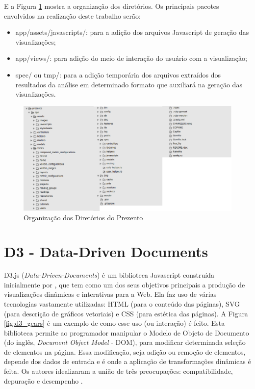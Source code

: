 \newpage

E a Figura \ref{fig:prezento_folders} mostra a organização dos diretórios. Os
principais pacotes envolvidos na realização deste trabalho serão:

\begin{itemize}
  \item app/assets/javascripts/: para a adição dos arquivos Javascript de
  geração das visualizações;
  \item app/views/: para adição do meio de interação do usuário com a
  visualização;
  \item spec/ ou tmp/: para a adição temporária dos arquivos extraídos dos
  resultados da análise em determinado formato que auxiliará na geração das
  visualizações.
\end{itemize}

\begin{figure}[!htb]
	\centering
    \includegraphics[keepaspectratio=true,scale=0.5]
    {figuras/prezento_folders.eps}
  \caption{Organização dos Diretórios do Prezento}
  \label{fig:prezento_folders}
\end{figure}

\newpage

\section{D3 - Data-Driven Documents}

D3.js (\textit{Data-Driven-Documents}) é um biblioteca Javascript construída
inicialmente por , que tem como um dos seus objetivos
principais a produção de visualizações dinâmicas e interativas para a Web. Ela
faz uso de várias tecnologias vastamente utilizadas: HTML (para o conteúdo das
páginas), SVG (para descrição de gráficos vetoriais) e CSS (para estética das
páginas). A Figura \ref{fig:d3_gears} é um exemplo de como esse uso (ou
interação) é feito. Esta biblioteca permite ao programador manipular o Modelo de
Objeto de Documento (do inglês, \textit{Document Object Model} - DOM), para
modificar determinada seleção de elementos na página. Essa modificação, seja
adição ou remoção de elementos, depende dos dados de entrada e é onde a
aplicação de transformações dinâmicas é feita. Os autores idealizaram a união de
três preocupações: compatibilidade, depuração e desempenho \cite{bostock2011d3}.

